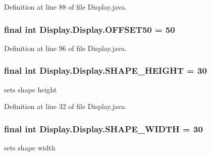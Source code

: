 Definition at line 88 of file Display.\+java.

\hypertarget{class_display_1_1_display_aab4544411ff6ce57f68415f53c73e2dc}{}
\subsubsection[{O\+F\+F\+S\+E\+T50}]{\setlength{\rightskip}{0pt plus 5cm}final int Display.\+Display.\+O\+F\+F\+S\+E\+T50 = 50\hspace{0.3cm}{\ttfamily [static]}}\label{class_display_1_1_display_aab4544411ff6ce57f68415f53c73e2dc}


Definition at line 96 of file Display.\+java.

\hypertarget{class_display_1_1_display_aeb8ee27fb9bb5ab9a43419faba0ff57e}{}
\subsubsection[{S\+H\+A\+P\+E\+\_\+\+H\+E\+I\+G\+H\+T}]{\setlength{\rightskip}{0pt plus 5cm}final int Display.\+Display.\+S\+H\+A\+P\+E\+\_\+\+H\+E\+I\+G\+H\+T = 30\hspace{0.3cm}{\ttfamily [private]}}\label{class_display_1_1_display_aeb8ee27fb9bb5ab9a43419faba0ff57e}
sets shape height 

Definition at line 32 of file Display.\+java.

\hypertarget{class_display_1_1_display_a98ff51285260ae5d3e0bf9a640385605}{}
\subsubsection[{S\+H\+A\+P\+E\+\_\+\+W\+I\+D\+T\+H}]{\setlength{\rightskip}{0pt plus 5cm}final int Display.\+Display.\+S\+H\+A\+P\+E\+\_\+\+W\+I\+D\+T\+H = 30\hspace{0.3cm}{\ttfamily [private]}}\label{class_display_1_1_display_a98ff51285260ae5d3e0bf9a640385605}
sets shape width 

